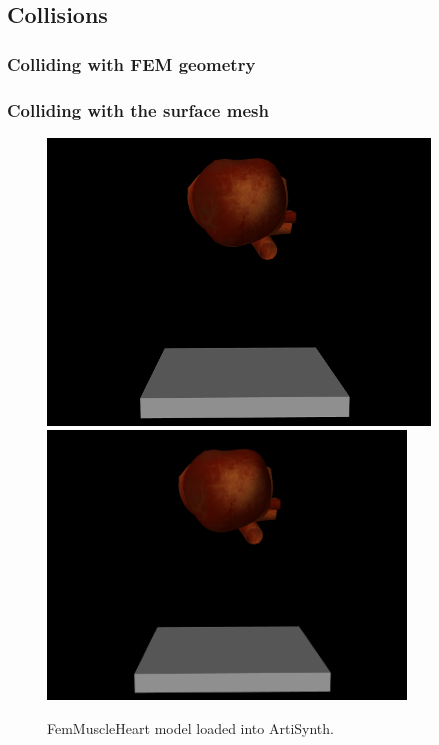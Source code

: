 
\subsection{Collisions}

\subsubsection{Colliding with FEM geometry}

\subsubsection{Colliding with the surface mesh}

\begin{figure}[h]
\begin{center}
\iflatexml
 \includegraphics[]{images/FemMuscleHeart}
\else
 \includegraphics[width=3.75in]{images/FemMuscleHeart}
\fi
\end{center}
\caption{FemMuscleHeart model loaded into ArtiSynth.}
\label{FemMuscleHeart:fig}
\end{figure}


